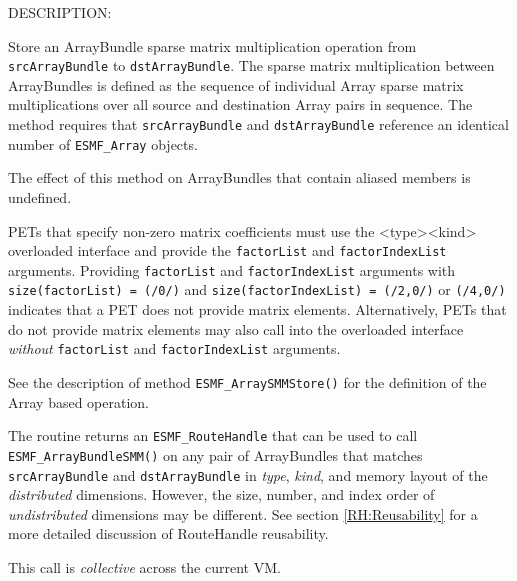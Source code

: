 {\sf DESCRIPTION:\\ }


     Store an ArrayBundle sparse matrix multiplication operation from
     {\tt srcArrayBundle} to {\tt dstArrayBundle}. The sparse matrix
     multiplication between ArrayBundles is defined as the sequence of
     individual Array sparse matrix multiplications over all source and
     destination Array pairs in sequence. The method requires that
     {\tt srcArrayBundle} and {\tt dstArrayBundle} reference an identical
     number of {\tt ESMF\_Array} objects.
  
     The effect of this method on ArrayBundles that contain aliased members is
     undefined.
  
     PETs that specify non-zero matrix coefficients must use
     the <type><kind> overloaded interface and provide the {\tt factorList} and
     {\tt factorIndexList} arguments. Providing {\tt factorList} and
     {\tt factorIndexList} arguments with {\tt size(factorList) = (/0/)} and
     {\tt size(factorIndexList) = (/2,0/)} or {\tt (/4,0/)} indicates that a 
     PET does not provide matrix elements. Alternatively, PETs that do not 
     provide matrix elements may also call into the overloaded interface
     {\em without} {\tt factorList} and {\tt factorIndexList} arguments.
     
     See the description of method {\tt ESMF\_ArraySMMStore()} for
     the definition of the Array based operation.
  
     The routine returns an {\tt ESMF\_RouteHandle} that can be used to call 
     {\tt ESMF\_ArrayBundleSMM()} on any pair of ArrayBundles that matches 
     {\tt srcArrayBundle} and {\tt dstArrayBundle} in {\em type}, {\em kind},
     and memory layout of the {\em distributed} dimensions. However, the size, 
     number, and index order of {\em undistributed} dimensions may be different.
     See section \ref{RH:Reusability} for a more detailed discussion of
     RouteHandle reusability.
    
     This call is {\em collective} across the current VM.
  
